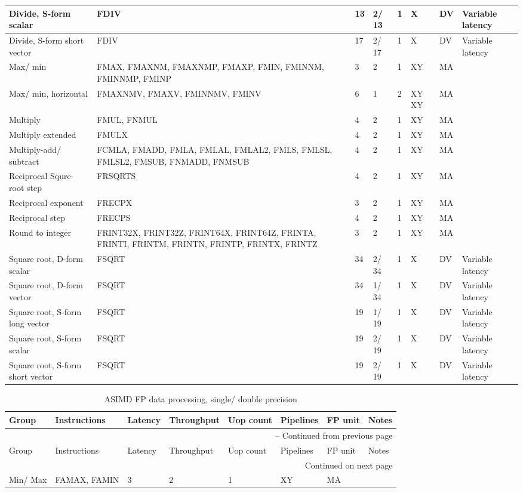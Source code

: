 \begin{longtable}{|p{1in}|p{1in}|l|l|l|p{1in}|l|p{1in}|}
\hline
Divide, S-form scalar & FDIV & 13 & 2/ 13 & 1 & X & DV & Variable latency\\
\hline
Divide, S-form short vector & FDIV & 17 & 2/ 17 & 1 & X & DV & Variable latency\\
\hline
Max/ min & FMAX, FMAXNM, FMAXNMP, FMAXP, FMIN, FMINNM, FMINNMP, FMINP & 3 & 2 & 1 & XY & MA & \\
\hline
Max/ min, horizontal & FMAXNMV, FMAXV, FMINNMV, FMINV & 6 & 1 & 2 & XY XY & MA & \\
\hline
Multiply & FMUL, FNMUL & 4 & 2 & 1 & XY & MA & \\
\hline
Multiply extended & FMULX & 4 & 2 & 1 & XY & MA & \\
\hline
Multiply-add/ subtract & FCMLA, FMADD, FMLA, FMLAL, FMLAL2, FMLS, FMLSL, FMLSL2, FMSUB, FNMADD, FNMSUB & 4 & 2 & 1 & XY & MA & \\
\hline
Reciprocal Squre-root step & FRSQRTS & 4 & 2 & 1 & XY & MA & \\
\hline
Reciprocal exponent & FRECPX & 3 & 2 & 1 & XY & MA & \\
\hline
Reciprocal step & FRECPS & 4 & 2 & 1 & XY & MA & \\
\hline
Round to integer & FRINT32X, FRINT32Z, FRINT64X, FRINT64Z, FRINTA, FRINTI, FRINTM, FRINTN, FRINTP, FRINTX, FRINTZ & 3 & 2 & 1 & XY & MA & \\
\hline
Square root, D-form scalar & FSQRT & 34 & 2/ 34 & 1 & X & DV & Variable latency\\
\hline
Square root, D-form vector & FSQRT & 34 & 1/ 34 & 1 & X & DV & Variable latency\\
\hline
Square root, S-form long vector & FSQRT & 19 & 1/ 19 & 1 & X & DV & Variable latency\\
\hline
Square root, S-form scalar & FSQRT & 19 & 2/ 19 & 1 & X & DV & Variable latency\\
\hline
Square root, S-form short vector & FSQRT & 19 & 2/ 19 & 1 & X & DV & Variable latency\\
\hline
\end{longtable}
\newpage
\begin{longtable}{|p{1in}|p{1in}|l|l|l|p{1in}|l|p{1in}|}
\caption{ASIMD FP data processing, single/ double precision} \\
\hline
Group & Instructions & Latency & Throughput & Uop count & Pipelines & FP unit & Notes\\
\hline
\endfirsthead
\hline
\multicolumn{8}{|r|}{{\tablename\ \thetable{} -- Continued from previous page}} \\
\hline
Group & Instructions & Latency & Throughput & Uop count & Pipelines & FP unit & Notes\\
\hline
\endhead
\hline
\multicolumn{8}{|r|}{{Continued on next page}} \\
\hline
\endfoot
\hline
\endlastfoot
Min/ Max & FAMAX, FAMIN & 3 & 2 & 1 & XY & MA & \\
\hline
\end{longtable}
